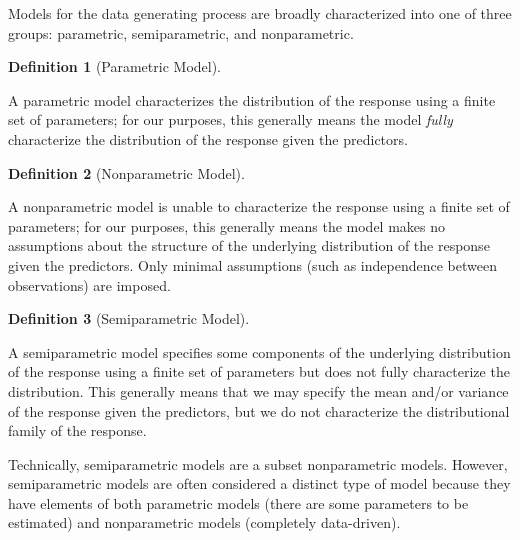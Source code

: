 \documentclass[
  letterpaper,
  DIV=11,
  numbers=noendperiod]{scrreprt}
\theoremstyle{definition}
\newtheorem{definition}{Definition}[chapter]
\theoremstyle{definition}
\theoremstyle{remark}
\begin{document}
Models for the data generating process are broadly characterized into
one of three groups: parametric, semiparametric, and nonparametric.

\begin{definition}[Parametric
Model]\protect\hypertarget{def-parametric-model}{}\label{def-parametric-model}

A parametric model characterizes the distribution of the response using
a finite set of parameters; for our purposes, this generally means the
model \emph{fully} characterize the distribution of the response given
the predictors.

\end{definition}

\begin{definition}[Nonparametric
Model]\protect\hypertarget{def-nonparametric-model}{}\label{def-nonparametric-model}

A nonparametric model is unable to characterize the response using a
finite set of parameters; for our purposes, this generally means the
model makes no assumptions about the structure of the underlying
distribution of the response given the predictors. Only minimal
assumptions (such as independence between observations) are imposed.

\end{definition}

\begin{definition}[Semiparametric
Model]\protect\hypertarget{def-semiparametric-model}{}\label{def-semiparametric-model}

A semiparametric model specifies some components of the underlying
distribution of the response using a finite set of parameters but does
not fully characterize the distribution. This generally means that we
may specify the mean and/or variance of the response given the
predictors, but we do not characterize the distributional family of the
response.

\end{definition}

\begin{tcolorbox}[enhanced jigsaw, left=2mm, toprule=.15mm, arc=.35mm, breakable, opacitybacktitle=0.6, opacityback=0, rightrule=.15mm, colbacktitle=quarto-callout-note-color!10!white, coltitle=black, leftrule=.75mm, toptitle=1mm, colframe=quarto-callout-note-color-frame, titlerule=0mm, title=\textcolor{quarto-callout-note-color}{\faInfo}\hspace{0.5em}{Note}, bottomrule=.15mm, colback=white, bottomtitle=1mm]

Technically, semiparametric models are a subset nonparametric models.
However, semiparametric models are often considered a distinct type of
model because they have elements of both parametric models (there are
some parameters to be estimated) and nonparametric models (completely
data-driven).

\end{tcolorbox}
\end{document}

